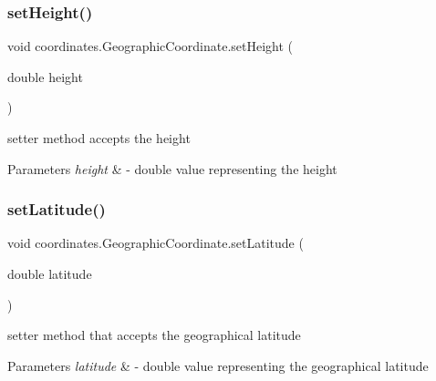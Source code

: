 \subsubsection{\texorpdfstring{set\+Height()}{setHeight()}}
{\footnotesize\ttfamily void coordinates.\+Geographic\+Coordinate.\+set\+Height (\begin{DoxyParamCaption}\item[{double}]{height }\end{DoxyParamCaption})}



setter method accepts the height 


\begin{DoxyParams}{Parameters}
{\em height} & -\/ double value representing the height \\
\hline
\end{DoxyParams}
\mbox{\label{classcoordinates_1_1_geographic_coordinate_a8baf5c2c81a9cd60ca73f74d63509775}} 
\subsubsection{\texorpdfstring{set\+Latitude()}{setLatitude()}}
{\footnotesize\ttfamily void coordinates.\+Geographic\+Coordinate.\+set\+Latitude (\begin{DoxyParamCaption}\item[{double}]{latitude }\end{DoxyParamCaption})}



setter method that accepts the geographical latitude 


\begin{DoxyParams}{Parameters}
{\em latitude} & -\/ double value representing the geographical latitude \\
\hline
\end{DoxyParams}
\mbox{\label{classcoordinates_1_1_geographic_coordinate_a72cfb2c3bcafcee1eff0da6b8e9da8fb}} 
